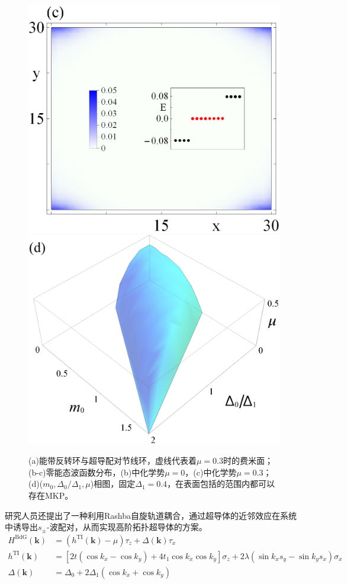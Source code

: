 \begin{figure}
\includegraphics[scale=0.45]{pic/fig12c}
\includegraphics[scale=0.09]{pic/fig12d}
\caption{(a)能带反转环与超导配对节线环，虚线代表着$\mu=0.3$时的费米面；(b-c)零能态波函数分布，(b)中化学势$\mu=0$，(c)中化学势$\mu=0.3$；(d)($m_0,\Delta_0/\Delta_1,\mu$)相图，固定$\Delta_1=0.4$，在表面包括的范围内都可以存在MKP。}\label{fig11}
\end{figure}

 研究人员还提出了一种利用Rashba自旋轨道耦合，通过超导体的近邻效应在系统中诱导出$s_\pm$-波配对，从而实现高阶拓扑超导体的方案\cite{re27}。
\begin{equation}
\begin{aligned}
H^{\mathrm{BdG}}(\mathbf{k})&=(h^{\mathrm{TI}}(\mathbf{k})-\mu)\tau_z+\Delta(\mathbf{k})\tau_x\\
h^{\mathrm{TI}}(\mathbf{k})&=\left[2t(\cos k_x-\cos k_y)+4t_1\cos k_x\cos k_y\right]\sigma_z+2\lambda(\sin k_xs_y-\sin k_ys_x)\sigma_x\\
\Delta(\mathbf{k})&=\Delta_0+2\Delta_1(\cos k_x+\cos k_y)\label{hosc2}
\end{aligned}
\end{equation}

